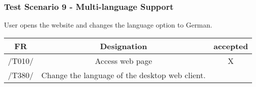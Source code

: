 \subsubsection{Test Scenario 9 - Multi-language Support}
User opens the website and changes the language option to German.
\begin{table}[h]
\begin{tabular}{!{\VRule}c!{\VRule}c!{\VRule}c!{\VRule}}
\hline
FR     & Designation                                                                    &accepted                \\
\hline
  /T010/ &  Access web page &   X  \\
 \hline
 /T380/  &  Change the language of the desktop web client.
 &     \\
 \hline
 
\end{tabular}
\end{table}
